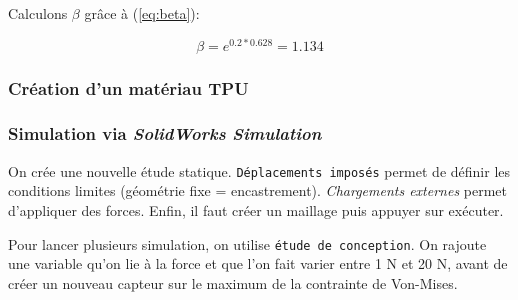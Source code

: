 \documentclass[a4paper, 11pt]{report}
\begin{document}
            Calculons $\beta$ grâce à (\ref{eq:beta}):

            \[
            \beta = e^{0.2 * 0.628} = 1.134
            \]

        \subsubsection{Création d'un matériau TPU}

        \subsubsection{Simulation via \textit{SolidWorks Simulation}}

            On crée une nouvelle étude statique. \texttt{Déplacements imposés} permet de définir les conditions limites (géométrie fixe = encastrement). \textit{Chargements externes} permet d'appliquer des forces. Enfin, il faut créer un maillage puis appuyer sur exécuter.

            Pour lancer plusieurs simulation, on utilise \texttt{étude de conception}. On rajoute une variable qu'on lie à la force et que l'on fait varier entre 1 N et 20 N, avant de créer un nouveau capteur sur le maximum de la contrainte de Von-Mises.
        
    
    
\end{document}
